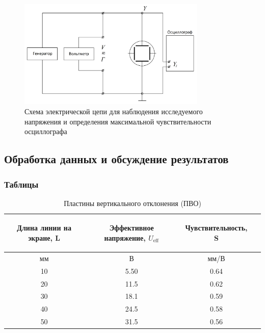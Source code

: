 \begin{figure}[H]
\centering
\includegraphics[width=0.8\textwidth]{Scheme4.png}
\caption{Схема электрической цепи для наблюдения исследуемого напряжения и определения максимальной чувствительности осциллографа}
\label{fig:Scheme4}
\end{figure}

\subsection{Обработка данных и обсуждение результатов}
 
\subsubsection{Таблицы}

\begin{center}
\begin{table}[H]
\centering
\caption{Пластины вертикального отклонения (ПВО)}
\label{tabl:1}
\renewcommand{\arraystretch}{1.15}
\begin{tabular}{|c|c|c|c|}
\hline
\begin{minipage}{5cm}
\begin{center}
    Длина линии на экране, L
\end{center}
\end{minipage} &
\begin{minipage}{5cm}
\begin{center}
    Эффективное напряжение, $U_{\text{eff}}$
\end{center}
\end{minipage} &
\begin{minipage}{5cm}
\begin{center}
    Чувствительность, S
\end{center}
\end{minipage}\\
\hline
мм&В&мм/В\\
\hline
10  &  5.50  &  0.64 \\
20  &  11.5  &  0.62 \\
30  &  18.1  &  0.59 \\
40  &  24.5  &  0.58 \\
50  &  31.5  &  0.56 \\
\hline
\end{tabular}
\end{table}
\end{center}

